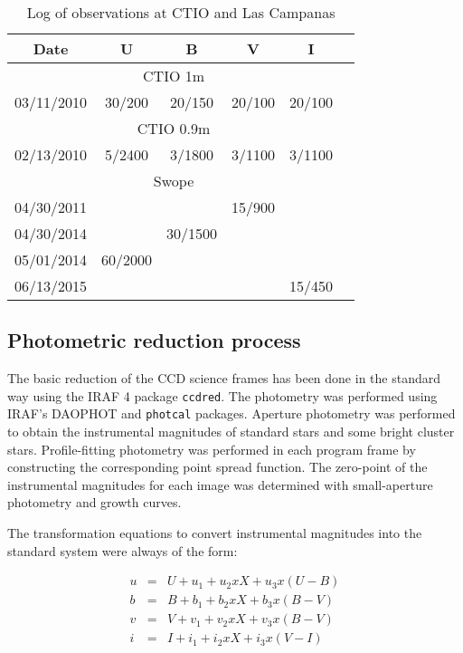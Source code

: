 \documentclass{aa}
\begin{document}
\begin{table}[ht]
    \centering
    \begin{tabular}{cccccc}
    \hline
         Date & U & B & V & I  \\
         \hline \hline
         \multicolumn{5}{c}{CTIO 1m}\\
         \hline
         03/11/2010 & 30/200 & 20/150 & 20/100 & 20/100\\
         \multicolumn{5}{c}{CTIO 0.9m}\\
         \hline
         02/13/2010 & 5/2400 & 3/1800 & 3/1100 & 3/1100\\
         \multicolumn{5}{c}{Swope}\\
         \hline
         04/30/2011 & & & 15/900 & \\
         04/30/2014 & & 30/1500 & & \\
         05/01/2014 & 60/2000 & & & \\
         06/13/2015 & & & & 15/450 \\
         \hline
    \end{tabular}
    \caption{Log of observations at CTIO and Las Campanas}
    \label{tab:log_ctio}
\end{table}




\subsection{Photometric reduction process}

The basic reduction of the CCD science frames has been done in the standard way
using the IRAF 4 package \texttt{ccdred}. The photometry was performed using
IRAF's DAOPHOT \citep{Stetson_1987,Stetson_1990} and \texttt{photcal} packages.
Aperture photometry was performed to obtain the instrumental magnitudes of
standard stars and some bright cluster stars. Profile-fitting photometry was
performed in each program frame by constructing the corresponding point spread
function. The zero-point of the instrumental magnitudes for each image was
determined with small-aperture photometry and growth curves.

The transformation equations to convert instrumental magnitudes into the
standard system were always of the form:

\begin{eqnarray*}
    u & = & U+u_1+u_2xX+u_3x(U-B) \\
    b & = & B+b_1+b_2xX+b_3x(B-V) \\
    v & = & V+v_1+v_2xX+v_3x(B-V) \\
    i & = & I+i_1+i_2xX+i_3x(V-I)
\end{eqnarray*}
\end{document}
